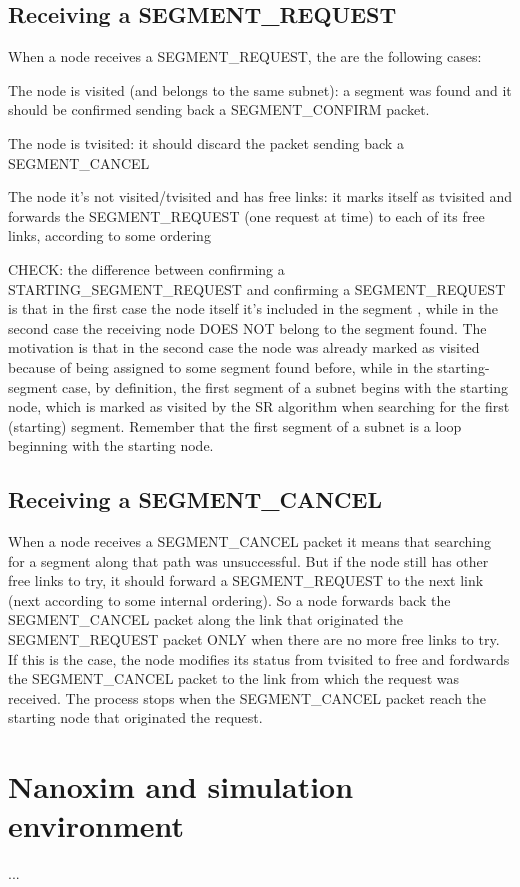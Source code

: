 \documentclass[conference]{IEEEtran}
\begin{document}
\subsection{Receiving a SEGMENT_REQUEST}
When a node receives a SEGMENT_REQUEST, the are the following cases:

The node is visited (and belongs to the same subnet): a segment was
found and it should be confirmed sending back a SEGMENT_CONFIRM
packet.  

The node is tvisited: it should discard the packet sending
back a SEGMENT_CANCEL 

The node it's not visited/tvisited and has free
links: it marks itself as tvisited and forwards the SEGMENT_REQUEST
(one request at time) to each of its free links, according to some
ordering

CHECK: the difference between confirming a STARTING_SEGMENT_REQUEST
and confirming a SEGMENT_REQUEST is that in the first case the node
itself it's included in the segment , while in the second case the
receiving node DOES NOT belong to the segment found. The motivation is
that in the second case the node was already marked as visited because
of being assigned to some segment found before, while in the
starting-segment case, by definition, the first segment of a subnet
begins with the starting node, which is marked as visited by the SR
algorithm when searching for the first (starting) segment. Remember
that the first segment of a subnet is a loop beginning with the
starting node. 

\subsection{Receiving a SEGMENT_CANCEL}
When a node receives a SEGMENT_CANCEL packet it means that searching
for a segment along that path was unsuccessful. But if the node still
has other free links to try, it should forward a SEGMENT_REQUEST to
the next link (next according to some internal ordering). So a node
forwards back the SEGMENT_CANCEL packet along the link that originated
the SEGMENT_REQUEST packet ONLY when there are no more free links to
try. If this is the case, the node modifies its status from tvisited
to free and fordwards the SEGMENT_CANCEL packet to the link from which
the request was received. The process stops when the SEGMENT_CANCEL
packet reach the starting node that originated the request.

\section{Nanoxim and simulation environment}
...
\end{document}
